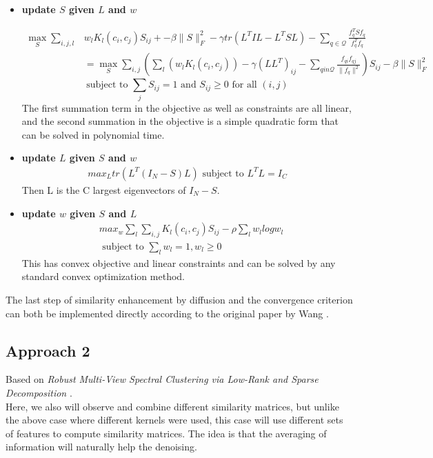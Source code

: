 \documentclass[11pt]{article}
\begin{document}
\begin{itemize}
\item \textbf{update $S$ given $L$ and $w$}

\begin{align}
\max_S \sum_{i,j,l} &w_l K_l (c_i, c_j) S_{ij} +-\beta \|S\|_F^2 - \gamma tr(L^TIL-L^TSL) - \sum_{q \in \mathcal{Q}} \frac{f_q^T S f_q}{f_q^Tf_q}\\
&= \max_S \sum_{i,j} \left( 
\sum_l (w_l K_l(c_i,c_j)) - \gamma (LL^T)_{ij} - \sum_{q in \mathcal{Q}} \frac{f_{qi} f_{qj}}{\|f_q\|^2}
\right)
S_{ij} - \beta \|S\|_F^2
\end{align}
$$\text{subject to     } \sum_j S_{ij} = 1 \text{   and    } S_{ij} \geq 0 \text{  for all  } (i,j) $$
The first summation term in the objective as well as constraints are all linear, and the second summation in the objective is a simple quadratic form that can be solved in polynomial time.


\item \textbf{update $L$ given $S$ and $w$}
\begin{align}
max_L tr(L^T(I_N-S)L) \text{  subject to   } L^TL = I_C
\end{align}
Then L is the C largest eigenvectors of $I_N-S$.

\item \textbf{update $w$ given $S$ and $L$}
\begin{align}
&max_w \sum_l \sum_{i,j} K_l (c_i, c_j)S_{ij} - \rho \sum_l w_l log w_l\\
&\text{  subject to   } \sum_l w_l = 1, w_l \geq 0
\end{align}
This has convex objective and linear constraints and can be solved by any standard convex optimization method.
\end{itemize}
\noindent 
The last step of similarity enhancement by diffusion and the convergence criterion can both be implemented directly according to the original paper by Wang \cite{wang2017visualization}. 
\subsection{Approach 2}
Based on \textit{Robust Multi-View Spectral Clustering via Low-Rank and Sparse Decomposition} \cite{xia2014robust}. \\

\noindent Here, we also will observe and combine different similarity matrices, but unlike the above case where different kernels were used, this case will use different sets of features to compute similarity matrices. The idea is that the averaging of information will naturally help the denoising.\\
\end{document}

